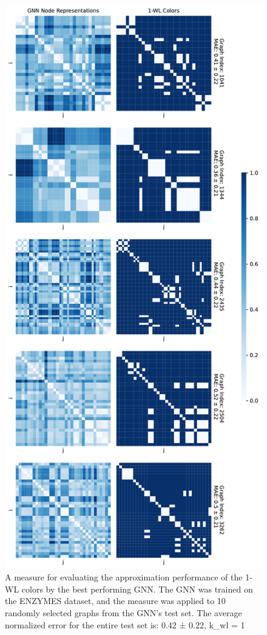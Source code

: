 \begin{figure}[!ht]
\begin{minipage}[b]{0.45992852703\textwidth}
    \end{minipage}
    \hfill
    \begin{minipage}[b]{0.53007147296\textwidth}
        \includegraphics[width=\textwidth, right]{Figures/heatmaps_NCI1_1_k_wl_1.pdf}
    \end{minipage}
    \hfill
    \caption{A measure for evaluating the approximation performance of the 1-WL colors by the best performing GNN. The GNN was trained on the ENZYMES dataset, and the measure was applied to 10 randomly selected graphs from the GNN's test set. The average normalized error for the entire test set is: 0.42 ± 0.22, k\_wl = 1}
\end{figure}

